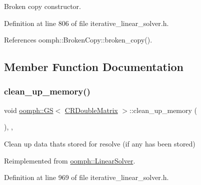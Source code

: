 Broken copy constructor. 



Definition at line 806 of file iterative\+\_\+linear\+\_\+solver.\+h.



References oomph\+::\+Broken\+Copy\+::broken\+\_\+copy().



\subsection{Member Function Documentation}
\mbox{\label{classoomph_1_1GS_3_01CRDoubleMatrix_01_4_a6e5470c508a10e89dd110463c7cea89a}} 
\subsubsection{\texorpdfstring{clean\+\_\+up\+\_\+memory()}{clean\_up\_memory()}}
{\footnotesize\ttfamily void \hyperlink{classoomph_1_1GS}{oomph\+::\+GS}$<$ \hyperlink{classoomph_1_1CRDoubleMatrix}{C\+R\+Double\+Matrix} $>$\+::clean\+\_\+up\+\_\+memory (\begin{DoxyParamCaption}{ }\end{DoxyParamCaption})\hspace{0.3cm}{\ttfamily [inline]}, {\ttfamily [private]}, {\ttfamily [virtual]}}



Clean up data that\textquotesingle{}s stored for resolve (if any has been stored) 



Reimplemented from \hyperlink{classoomph_1_1LinearSolver_a9d66f3262e80ca06a365f98216afd85f}{oomph\+::\+Linear\+Solver}.



Definition at line 969 of file iterative\+\_\+linear\+\_\+solver.\+h.

\mbox{\label{classoomph_1_1GS_3_01CRDoubleMatrix_01_4_a41c2dd2610f61fd9e25053511fdd9eab}} 
